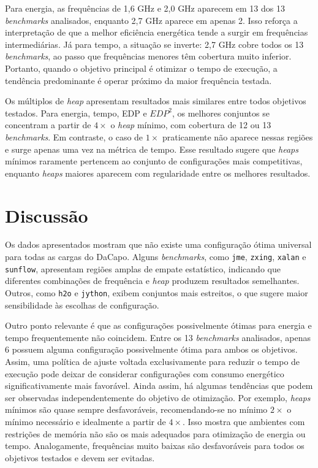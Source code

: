 Para energia, as frequências de 1{,}6 GHz e 2{,}0 GHz aparecem em 13 dos 13
\textit{benchmarks} analisados, enquanto 2{,}7 GHz aparece em apenas 2. Isso
reforça a interpretação de que a melhor eficiência energética tende a surgir em
frequências intermediárias. Já para tempo, a situação se inverte: 2{,}7 GHz
cobre todos os 13 \textit{benchmarks}, ao passo que frequências menores têm
cobertura muito inferior. Portanto, quando o objetivo principal é otimizar o 
tempo de execução, a tendência predominante é operar próximo da maior frequência 
testada.

Os múltiplos de \textit{heap} apresentam resultados mais similares entre todos 
objetivos testados. Para energia, tempo, EDP e \(EDP^2\), os melhores conjuntos se 
concentram a partir de \(4\times\) o \textit{heap} mínimo, com cobertura de 
12 ou 13 \textit{benchmarks}. Em contraste, o caso de \(1\times\) praticamente 
não aparece nessas regiões e surge apenas uma vez na métrica de tempo. Esse 
resultado sugere que \textit{heaps} mínimos raramente pertencem ao 
conjunto de configurações mais competitivas, enquanto \textit{heaps} maiores 
aparecem com regularidade entre os melhores resultados.

\section{Discussão}

Os dados apresentados mostram que não existe uma configuração ótima
universal para todas as cargas do DaCapo. Alguns \textit{benchmarks}, como
\texttt{jme}, \texttt{zxing}, \texttt{xalan} e \texttt{sunflow}, apresentam
regiões amplas de empate estatístico, indicando que diferentes combinações de
frequência e \textit{heap} produzem resultados semelhantes. Outros, como
\texttt{h2o} e \texttt{jython}, exibem conjuntos mais estreitos, o que sugere
maior sensibilidade às escolhas de configuração.

Outro ponto relevante é que as configurações possivelmente ótimas para energia e tempo 
frequentemente não coincidem. Entre os 13 \textit{benchmarks} analisados, apenas 6 possuem alguma
configuração possivelmente ótima para ambos os objetivos. Assim, uma 
política de ajuste voltada exclusivamente para reduzir o tempo de execução 
pode deixar de considerar configurações com consumo energético significativamente 
mais favorável. Ainda assim, há algumas tendências que podem ser observadas 
independentemente do objetivo de otimização. Por exemplo, \textit{heaps} 
mínimos são quase sempre desfavoráveis, recomendando-se no mínimo \(2\times\) 
o mínimo necessário e idealmente a partir de \(4\times\). Isso mostra que ambientes 
com restrições de memória não são os mais adequados para otimização de energia ou tempo. 
Analogamente, frequências muito baixas são desfavoráveis para todos os objetivos 
testados e devem ser evitadas.

